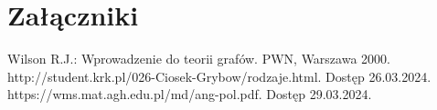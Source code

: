 \documentclass[12pt,twoside]{article}
\begin{document}
\clearpage

\section*{Załączniki}


\clearpage


\begin{thebibliography}{4}
 Wilson R.J.: Wprowadzenie do teorii grafów. PWN, Warszawa 2000.
 http://student.krk.pl/026-Ciosek-Grybow/rodzaje.html. Dostęp 26.03.2024.
 https://wms.mat.agh.edu.pl/\texttildelow md/ang-pol.pdf. Dostęp 29.03.2024.
\end{thebibliography}

\clearpage

\makesummary
\end{document}

